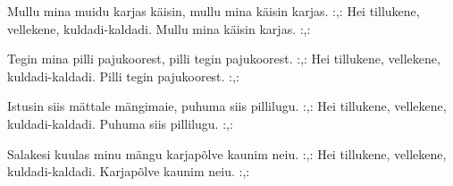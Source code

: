 Mullu mina muidu karjas k\"aisin,
mullu mina k\"aisin karjas.
:,: Hei tillukene, vellekene,
    kuldadi-kaldadi.
    Mullu mina k\"aisin karjas. :,: 

Tegin mina pilli pajukoorest,
pilli tegin pajukoorest.
:,: Hei tillukene, vellekene,
    kuldadi-kaldadi.
    Pilli tegin pajukoorest. :,: 

Istusin siis m\"attale m\"angimaie,
puhuma siis pillilugu.
:,: Hei tillukene, vellekene,
    kuldadi-kaldadi.
    Puhuma siis pillilugu. :,: 

Salakesi kuulas minu m\"angu
karjap\~olve kaunim neiu.
:,: Hei tillukene, vellekene,
    kuldadi-kaldadi.
    Karjap\~olve kaunim neiu. :,: 
